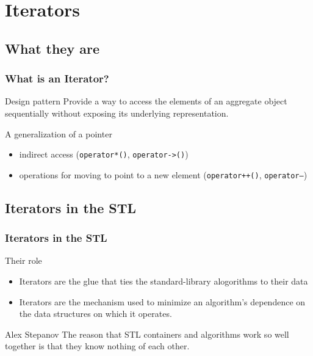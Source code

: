 \section{Iterators}
\subsection{What they are}
\begin{frame}
  \frametitle{What is an Iterator?}
  \begin{block}{Design pattern}
    Provide a way to access the elements of an aggregate object sequentially without exposing its underlying representation.
  \end{block}
  \vfill
  \begin{block}{A generalization of a pointer}
    \begin{itemize}
    \item indirect access (\texttt{operator*()}, \texttt{operator->()})
    \item operations for moving to point to a new element (\texttt{operator++()}, \texttt{operator--}) 
    \end{itemize}
  \end{block}
\end{frame}

\subsection{Iterators in the STL}

\begin{frame}
  \frametitle{Iterators in the STL}
  \begin{block}{Their role}
    \begin{itemize}
    \item Iterators are the glue that ties the standard-library alogorithms to their data
    \item Iterators are the mechanism used to minimize an algorithm's dependence on the data structures on which it operates.
      \end{itemize}
  \end{block}
\vfill
  \begin{block}{Alex Stepanov}
    The reason that STL containers and algorithms work so well together is that they know nothing of each other.
    \end{block}
\end{frame}

